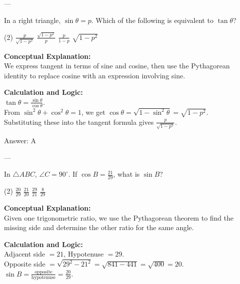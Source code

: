 \documentclass[11pt,paper=a4,answers]{exam}
\begin{document}
\begin{questions}
---

\question
In a right triangle, $\sin \theta = p$. Which of the following is equivalent to $\tan \theta$?
\begin{tasks}(2)
    \task $\frac{p}{\sqrt{1-p^2}}$
    \task $\frac{\sqrt{1-p^2}}{p}$
    \task $\frac{p}{1-p}$
    \task $\sqrt{1-p^2}$
\end{tasks}

\begin{solution}
\textbf{Conceptual Explanation:} \\
We express tangent in terms of sine and cosine, then use the Pythagorean identity to replace cosine with an expression involving sine.

\vspace{10pt}
\textbf{Calculation and Logic:} \\
$\tan \theta = \frac{\sin \theta}{\cos \theta}$. \\
From $\sin^2 \theta + \cos^2 \theta = 1$, we get $\cos \theta = \sqrt{1 - \sin^2 \theta} = \sqrt{1 - p^2}$. \\
Substituting these into the tangent formula gives $\frac{p}{\sqrt{1 - p^2}}$.

\vspace{15pt}
Answer: \colorbox{yellow!100}{A}
\end{solution}

---

\question
In $\triangle ABC$, $\angle C = 90^\circ$. If $\cos B = \frac{21}{29}$, what is $\sin B$?
\begin{tasks}(2)
    \task $\frac{20}{29}$
    \task $\frac{21}{20}$
    \task $\frac{29}{21}$
    \task $\frac{8}{29}$
\end{tasks}

\begin{solution}
\textbf{Conceptual Explanation:} \\
Given one trigonometric ratio, we use the Pythagorean theorem to find the missing side and determine the other ratio for the same angle.

\vspace{10pt}
\textbf{Calculation and Logic:} \\
Adjacent side $= 21$, Hypotenuse $= 29$. \\
Opposite side $= \sqrt{29^2 - 21^2} = \sqrt{841 - 441} = \sqrt{400} = 20$. \\
$\sin B = \frac{\text{opposite}}{\text{hypotenuse}} = \frac{20}{29}$.


\end{solution}
\end{questions}
\end{document}
